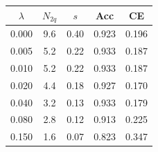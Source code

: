 \begin{tabular}{ccccc}
\toprule
$\lambda$ & $N_{2q}$ & $s$ & Acc & CE \\
\midrule
0.000 & 9.6 & 0.40 & 0.923 & 0.196 \\
0.005 & 5.2 & 0.22 & 0.933 & 0.187 \\
0.010 & 5.2 & 0.22 & 0.933 & 0.187 \\
0.020 & 4.4 & 0.18 & 0.927 & 0.170 \\
0.040 & 3.2 & 0.13 & 0.933 & 0.179 \\
0.080 & 2.8 & 0.12 & 0.913 & 0.225 \\
0.150 & 1.6 & 0.07 & 0.823 & 0.347 \\
\bottomrule
\end{tabular}